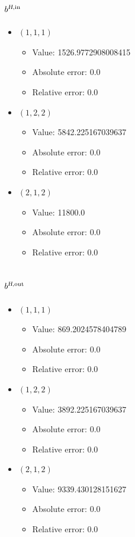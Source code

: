 \documentclass{article}%
\begin{document}
\subsection{$b^{\textsl{H},\text{in}}$}%
\begin{itemize}%
	\item $(1, 1, 1)$%
	\begin{itemize}%
		\item Value: 1526.9772908008415%
		\item Absolute error: 0.0%
		\item Relative error: 0.0%
	\end{itemize}%
	\item $(1, 2, 2)$%
	\begin{itemize}%
		\item Value: 5842.225167039637%
		\item Absolute error: 0.0%
		\item Relative error: 0.0%
	\end{itemize}%
	\item $(2, 1, 2)$%
	\begin{itemize}%
		\item Value: 11800.0%
		\item Absolute error: 0.0%
		\item Relative error: 0.0%
	\end{itemize}%
\end{itemize}%
\subsection{$b^{\textsl{H},\text{out}}$}%
\begin{itemize}%
	\item $(1, 1, 1)$%
	\begin{itemize}%
		\item Value: 869.2024578404789%
		\item Absolute error: 0.0%
		\item Relative error: 0.0%
	\end{itemize}%
	\item $(1, 2, 2)$%
	\begin{itemize}%
		\item Value: 3892.225167039637%
		\item Absolute error: 0.0%
		\item Relative error: 0.0%
	\end{itemize}%
	\item $(2, 1, 2)$%
	\begin{itemize}%
		\item Value: 9339.430128151627%
		\item Absolute error: 0.0%
		\item Relative error: 0.0%
	\end{itemize}%
\end{itemize}%
\end{document}
